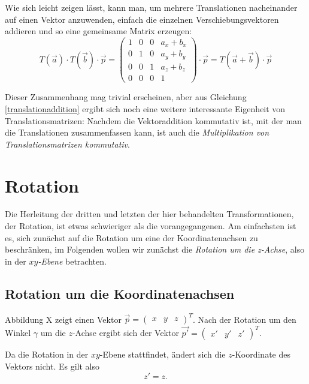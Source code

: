 Wie sich leicht zeigen lässt, kann man, um mehrere Translationen nacheinander auf einen Vektor anzuwenden, einfach die einzelnen Verschiebungsvektoren addieren und so eine gemeinsame Matrix erzeugen:
\begin{equation}
 \label{translationaddition}
 T{(\vec a)} \cdot T{(\vec b)} \cdot \vec p = 
 \begin{pmatrix}
  1 & 0 & 0 & a_x + b_x \\
  0 & 1 & 0 & a_y + b_y \\
  0 & 0 & 1 & a_z + b_z \\
  0 & 0 & 0 & 1
 \end{pmatrix} \cdot \vec p = T{(\vec a + \vec b)} \cdot \vec p
\end{equation}

Dieser Zusammenhang mag trivial erscheinen, aber aus Gleichung \ref{translationaddition} ergibt sich noch eine weitere interessante Eigenheit von Translationsmatrizen: Nachdem die Vektoraddition kommutativ ist, mit der man die Translationen zusammenfassen kann, ist auch die \emph{Multiplikation von Translationsmatrizen kommutativ}.

\section{Rotation}
Die Herleitung der dritten und letzten der hier behandelten Transformationen, der Rotation, ist etwas schwieriger als die vorangegangenen. Am einfachsten ist es, sich zunächst auf die Rotation um eine der Koordinatenachsen zu beschränken, im Folgenden wollen wir zunächst die \emph{Rotation um die z-Achse}, also in der \emph{$xy$-Ebene} betrachten.

\subsection{Rotation um die Koordinatenachsen}
Abbildung X zeigt einen Vektor $\vec p = \begin{pmatrix} x & y & z \end{pmatrix}^T$. Nach der Rotation um den Winkel $\gamma$ um die $z$-Achse ergibt sich der Vektor $\vec{p'} = \begin{pmatrix} x' & y' & z' \end{pmatrix}^T$.

Da die Rotation in der $xy$-Ebene stattfindet, ändert sich die $z$-Koordinate des Vektors nicht. Es gilt also
\begin{equation}
 z' = z.
\end{equation}

